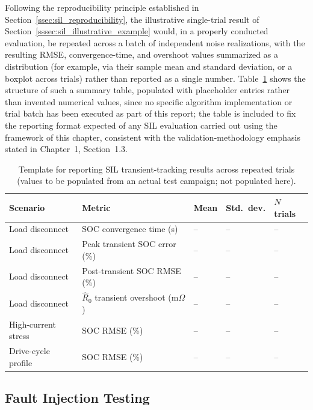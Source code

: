 Following the reproducibility principle established in Section~\ref{ssec:sil_reproducibility}, the illustrative single-trial result of Section~\ref{sssec:sil_illustrative_example} would, in a properly conducted evaluation, be repeated across a batch of independent noise realizations, with the resulting RMSE, convergence-time, and overshoot values summarized as a distribution (for example, via their sample mean and standard deviation, or a boxplot across trials) rather than reported as a single number. Table~\ref{tab:sil_metric_summary_template} shows the structure of such a summary table, populated with placeholder entries rather than invented numerical values, since no specific algorithm implementation or trial batch has been executed as part of this report; the table is included to fix the reporting format expected of any SIL evaluation carried out using the framework of this chapter, consistent with the validation-methodology emphasis stated in Chapter~1, Section~1.3.

\begin{table}[htbp]
	\centering
	\caption{Template for reporting SIL transient-tracking results across repeated trials (values to be populated from an actual test campaign; not populated here).}
	\label{tab:sil_metric_summary_template}
	\begin{tabular}{p{3.4cm}p{2.6cm}p{2.6cm}p{2.6cm}p{2.4cm}}
		\toprule
		Scenario & Metric & Mean & Std.\ dev. & $N$ trials \\
		\midrule
		Load disconnect & SOC convergence time (s) & -- & -- & -- \\
		Load disconnect & Peak transient SOC error (\%) & -- & -- & -- \\
		Load disconnect & Post-transient SOC RMSE (\%) & -- & -- & -- \\
		Load disconnect & $\hat{R}_0$ transient overshoot (m$\Omega$) & -- & -- & -- \\
		High-current stress & SOC RMSE (\%) & -- & -- & -- \\
		Drive-cycle profile & SOC RMSE (\%) & -- & -- & -- \\
		\bottomrule
	\end{tabular}
\end{table}

\subsection{Fault Injection Testing}
\label{ssec:fault_injection}

